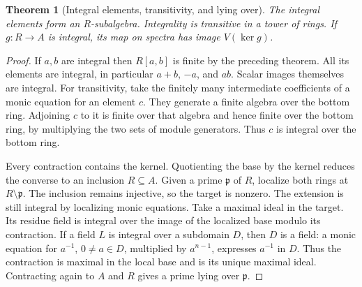 \documentclass[11pt,oneside,openany]{book}
\newtheorem{theorem}{Theorem}[chapter]
\theoremstyle{definition}
\theoremstyle{remark}
\begin{document}
\begin{theorem}[Integral elements, transitivity, and lying over]\label{p103:ALG-05-C01-R03}
The integral elements form an \(R\)-subalgebra. Integrality is transitive in a tower of rings. If \(g:R\to A\) is integral, its map on spectra has image \(V(\ker g)\).
\end{theorem}
\begin{proof}
If \(a,b\) are integral then \(R[a,b]\) is finite by the preceding theorem. All its elements are integral, in particular \(a+b\), \(-a\), and \(ab\). Scalar images themselves are integral. For transitivity, take the finitely many intermediate coefficients of a monic equation for an element \(c\). They generate a finite algebra over the bottom ring. Adjoining \(c\) to it is finite over that algebra and hence finite over the bottom ring, by multiplying the two sets of module generators. Thus \(c\) is integral over the bottom ring.

Every contraction contains the kernel. Quotienting the base by the kernel reduces the converse to an inclusion \(R\subseteq A\). Given a prime \(\mathfrak p\) of \(R\), localize both rings at \(R\setminus\mathfrak p\). The inclusion remains injective, so the target is nonzero. The extension is still integral by localizing monic equations. Take a maximal ideal in the target. Its residue field is integral over the image of the localized base modulo its contraction. If a field \(L\) is integral over a subdomain \(D\), then \(D\) is a field: a monic equation for \(a^{-1}\), \(0\ne a\in D\), multiplied by \(a^{n-1}\), expresses \(a^{-1}\) in \(D\). Thus the contraction is maximal in the local base and is its unique maximal ideal. Contracting again to \(A\) and \(R\) gives a prime lying over \(\mathfrak p\).
\end{proof}
\end{document}
